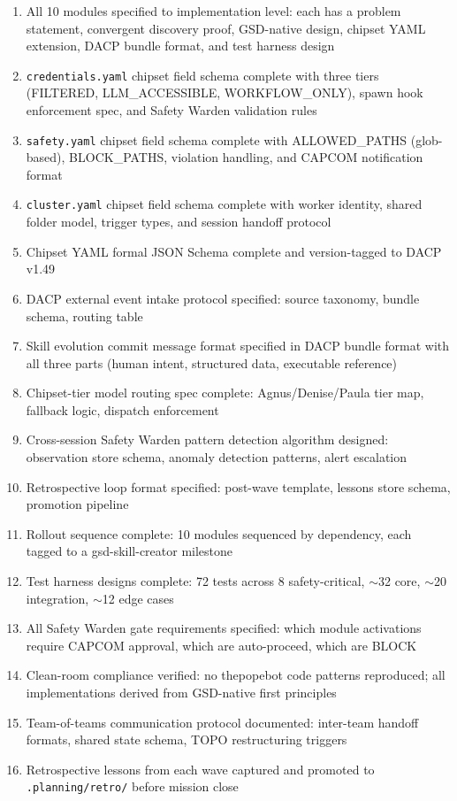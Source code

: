 \documentclass[11pt,letterpaper]{article}
\begin{document}
\begin{enumerate}
  \item All 10 modules specified to implementation level: each has a problem statement, convergent discovery proof, GSD-native design, chipset YAML extension, DACP bundle format, and test harness design
  \item \texttt{credentials.yaml} chipset field schema complete with three tiers (FILTERED, LLM\_ACCESSIBLE, WORKFLOW\_ONLY), spawn hook enforcement spec, and Safety Warden validation rules
  \item \texttt{safety.yaml} chipset field schema complete with ALLOWED\_PATHS (glob-based), BLOCK\_PATHS, violation handling, and CAPCOM notification format
  \item \texttt{cluster.yaml} chipset field schema complete with worker identity, shared folder model, trigger types, and session handoff protocol
  \item Chipset YAML formal JSON Schema complete and version-tagged to DACP v1.49
  \item DACP external event intake protocol specified: source taxonomy, bundle schema, routing table
  \item Skill evolution commit message format specified in DACP bundle format with all three parts (human intent, structured data, executable reference)
  \item Chipset-tier model routing spec complete: Agnus/Denise/Paula tier map, fallback logic, dispatch enforcement
  \item Cross-session Safety Warden pattern detection algorithm designed: observation store schema, anomaly detection patterns, alert escalation
  \item Retrospective loop format specified: post-wave template, lessons store schema, promotion pipeline
  \item Rollout sequence complete: 10 modules sequenced by dependency, each tagged to a gsd-skill-creator milestone
  \item Test harness designs complete: 72 tests across 8 safety-critical, $\sim$32 core, $\sim$20 integration, $\sim$12 edge cases
  \item All Safety Warden gate requirements specified: which module activations require CAPCOM approval, which are auto-proceed, which are BLOCK
  \item Clean-room compliance verified: no thepopebot code patterns reproduced; all implementations derived from GSD-native first principles
  \item Team-of-teams communication protocol documented: inter-team handoff formats, shared state schema, TOPO restructuring triggers
  \item Retrospective lessons from each wave captured and promoted to \texttt{.planning/retro/} before mission close
\end{enumerate}
\end{document}
